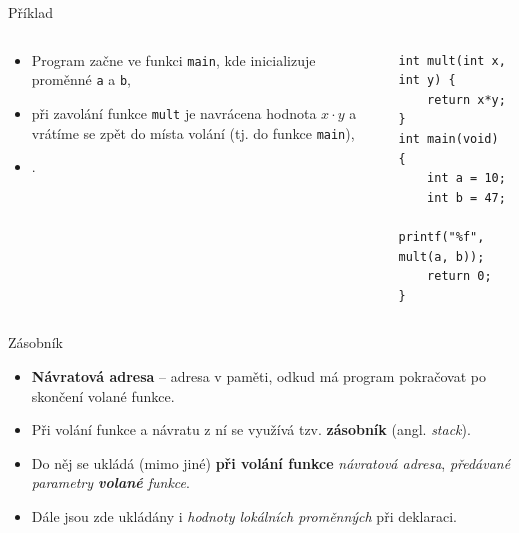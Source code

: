 \documentclass[14pt,aspectratio=169]{beamer}
\begin{document}
    \begin{frame}[t,fragile]{Příklad}
        \begin{columns}[onlytextwidth]
            \begin{column}{0.55\textwidth}
                \begin{itemize}
                    \item Program začne ve funkci \texttt{main}, kde inicializuje proměnné \texttt{a} a \texttt{b},
                    \item při zavolání funkce \texttt{mult} je navrácena hodnota $x\cdot y$ a vrátíme se zpět do místa volání (tj. do funkce \texttt{main}),
                    \item {} .
                \end{itemize}
            \end{column}
            
            \begin{column}{0.41\textwidth}
                \begin{lstlisting}
int mult(int x, int y) {
    return x*y;
}
int main(void) {
    int a = 10;
    int b = 47;
    printf("%f", mult(a, b));
    return 0;
}
                \end{lstlisting}
            \end{column}
        \end{columns}
        
    \end{frame}

    \begin{frame}[t]{Zásobník}
        \begin{itemize}
            \item \textbf{Návratová adresa} -- adresa v paměti, odkud má program pokračovat po skončení volané funkce.
            \item Při volání funkce a návratu z ní se využívá tzv. \textbf{zásobník} (angl. \emph{stack}).
            \item Do něj se ukládá (mimo jiné) \textbf{při volání funkce} \emph{návratová adresa}, \emph{předávané parametry \textbf{volané} funkce}.
            \item Dále jsou zde ukládány i \emph{hodnoty lokálních proměnných} při deklaraci.
        \end{itemize}
    \end{frame}
\end{document}

